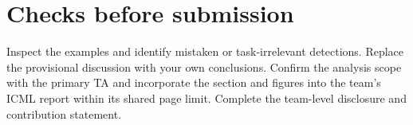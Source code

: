 \documentclass[10pt,twocolumn]{article}
\begin{document}
\section*{Checks before submission}
Inspect the examples and identify mistaken or task-irrelevant detections. Replace the provisional discussion with your own conclusions. Confirm the analysis scope with the primary TA and incorporate the section and figures into the team's ICML report within its shared page limit. Complete the team-level disclosure and contribution statement.
\end{document}
